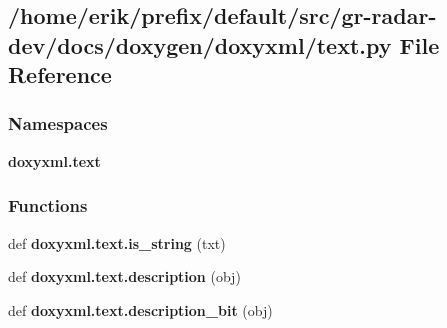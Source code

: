 \subsection{/home/erik/prefix/default/src/gr-\/radar-\/dev/docs/doxygen/doxyxml/text.py File Reference}
\label{text_8py}
\subsubsection*{Namespaces}
\begin{DoxyCompactItemize}
\item 
 {\bf doxyxml.\+text}
\end{DoxyCompactItemize}
\subsubsection*{Functions}
\begin{DoxyCompactItemize}
\item 
def {\bf doxyxml.\+text.\+is\+\_\+string} (txt)
\item 
def {\bf doxyxml.\+text.\+description} (obj)
\item 
def {\bf doxyxml.\+text.\+description\+\_\+bit} (obj)
\end{DoxyCompactItemize}
